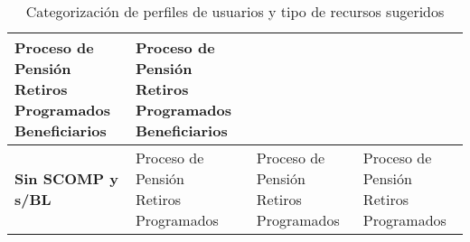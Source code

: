 \begin{table}[h!]
\begin{tabular}{>{\bfseries}p{1.5 cm} p{4.5cm} p{4.5cm} p{4.5cm}}
\makecell[l]{Proceso de Pensión\\Retiros Programados\\Beneficiarios}  &
\makecell[l]{Proceso de Pensión\\Retiros Programados\\Beneficiarios}  
\\
\midrule
\textbf{Sin SCOMP y s/BL}  & \makecell[l]{Proceso de Pensión\\Retiros Programados} &
\makecell[l]{Proceso de Pensión\\Retiros Programados}  &
\makecell[l]{Proceso de Pensión\\Retiros Programados}  \\

\bottomrule
\end{tabular}
\caption{Categorización de perfiles de usuarios y tipo de recursos sugeridos}
\end{table}

